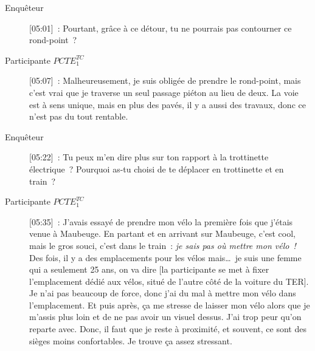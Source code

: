 \begin{description}
    \item[Enquêteur] [05:01]~: Pourtant, grâce à ce détour, tu ne pourrais pas contourner ce rond-point~?
    \item[Participante \(PCTE^{TC}_{1}\)] [05:07]~: Malheureusement, je suis obligée de prendre le rond-point, mais c’est vrai que je traverse un seul passage piéton au lieu de deux. La voie est à sens unique, mais en plus des pavés, il y a aussi des travaux, donc ce n’est pas du tout rentable.
    \item[Enquêteur] [05:22]~: Tu peux m'en dire plus sur ton rapport à la trottinette électrique~? Pourquoi as-tu choisi de te déplacer en trottinette et en train~?
    \item[Participante \(PCTE^{TC}_{1}\)] [05:35]~: J’avais essayé de prendre mon vélo la première fois que j’étais venue à Maubeuge. En partant et en arrivant sur Maubeuge, c’est cool, mais le gros souci, c’est dans le train~: \textsl{je sais pas où mettre mon vélo~!} Des fois, il y a des emplacements pour les vélos mais\dots~je suis une femme qui a seulement 25 ans, on va dire [la participante se met à fixer l'emplacement dédié aux vélos, situé de l'autre côté de la voiture du TER]. Je n’ai pas beaucoup de force, donc j’ai du mal à mettre mon vélo dans l’emplacement. Et puis après, ça me stresse de laisser mon vélo alors que je m’assis plus loin et de ne pas avoir un visuel dessus. J’ai trop peur qu’on reparte avec. Donc, il faut que je reste à proximité, et souvent, ce sont des sièges moins confortables. Je trouve ça assez stressant.%
    

\end{description}
